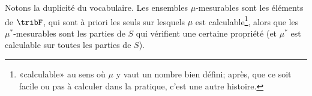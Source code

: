 \begin{remark}
	Notons la duplicité du vocabulaire. Les ensembles \( \mu\)-mesurables sont les éléments de \( \tribF\), qui sont à priori les seuls sur lesquels \( \mu\) est calculable\footnote{«calculable» au sens où \( \mu\) y vaut un nombre bien défini; après, que ce soit facile ou pas à calculer dans la pratique, c'est une autre histoire.}, alors que les \( \mu^*\)-mesurables sont les parties de \( S\) qui vérifient une certaine propriété (et \( \mu^*\) est calculable sur toutes les parties de \( S\)).
\end{remark}
